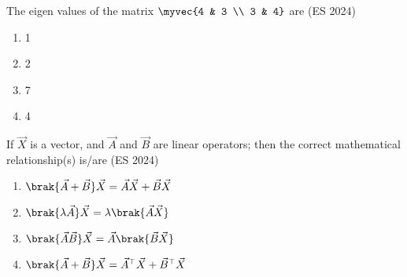 \item The eigen values of the matrix $ \myvec{4 & 3 \\ 3 & 4}$ are \hfill (ES 2024)

\begin{multicols}{4}
\begin{enumerate}
\item 1
\item 2
\item 7
\item 4
\end{enumerate}
\end{multicols}

\item If $\vec{X}$ is a vector, and $\vec{A}$ and $\vec{B}$ are linear operators; then the correct mathematical relationship(s) is/are \hfill (ES 2024)
\begin{multicols}{2}
\begin{enumerate}
\item $\brak{\vec{A}+\vec{B}}\vec{X} = \vec{A}\vec{X} + \vec{B}\vec{X}$
\item $\brak{\lambda \vec{A}}\vec{X} = \lambda\brak{\vec{A}\vec{X}}$
\item $\brak{\vec{A}\vec{B}}\vec{X} = \vec{A}\brak{\vec{B}\vec{X}}$
\item $\brak{\vec{A}+\vec{B}}\vec{X} = \vec{A}^{\top}\vec{X} + \vec{B}^{\top}\vec{X}$
\end{enumerate}
\end{multicols}

